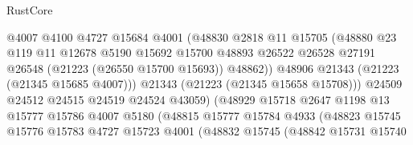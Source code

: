 \begin{lexlean}{RustCore}
\begin{coremodule}
                                    @4007
                                    @4100
                                    @4727
                                    @15684
                                    @4001
                                    (@48830
                                      @2818
                                      @11
                                      @15705
                                      (@48880
                                        @23
                                        @119
                                        @11
                                        @12678
                                        @5190
                                        @15692
                                        @15700
                                        @48893
                                        @26522
                                        @26528
                                        @27191
                                        @26548
                                        (@21223 (@26550 @15700 @15693))
                                        @48862))
                                    @48906
                                    @21343
                                    (@21223 (@21345 @15685 @4007)))
                                  @21343
                                  (@21223 (@21345 @15658 @15708)))
                                @24509
                                @24512
                                @24515
                                @24519
                                @24524
                                @43059)
                              (@48929
                                @15718
                                @2647
                                @1198
                                @13
                                @15777
                                @15786
                                @4007
                                @5180
                                (@48815
                                  @15777
                                  @15784
                                  @4933
                                  (@48823
                                    @15745
                                    @15776
                                    @15783
                                    @4727
                                    @15723
                                    @4001
                                    (@48832
                                      @15745
                                      (@48842
                                        @15731
                                        @15740

\end{coremodule}
\end{lexlean}
